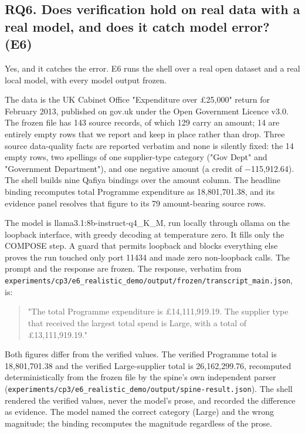 \documentclass[11pt,a4paper]{article}
\begin{document}
\subsection*{RQ6. Does verification hold on real data with a real model, and does it catch model error? (E6)}
Yes, and it catches the error. E6 runs the shell over a real open dataset and a real local model, with every model output frozen.

The data is the UK Cabinet Office "Expenditure over \pounds{}25,000" return for February 2013, published on gov.uk under the Open Government Licence v3.0. The frozen file has 143 source records, of which 129 carry an amount; 14 are entirely empty rows that we report and keep in place rather than drop. Three source data-quality facts are reported verbatim and none is silently fixed: the 14 empty rows, two spellings of one supplier-type category ("Gov Dept" and "Government Department"), and one negative amount (a credit of $-$115,912.64). The shell builds nine Qafiya bindings over the amount column. The headline binding recomputes total Programme expenditure as 18,801,701.38, and its evidence panel resolves that figure to its 79 amount-bearing source rows.

The model is llama3.1:8b-instruct-q4\_K\_M, run locally through ollama on the loopback interface, with greedy decoding at temperature zero. It fills only the COMPOSE step. A guard that permits loopback and blocks everything else proves the run touched only port 11434 and made zero non-loopback calls. The prompt and the response are frozen. The response, verbatim from \texttt{experiments/cp3/e6\_realistic\_demo/output/frozen/transcript\_main.json}, is:

\begin{quote}
"The total Programme expenditure is \pounds{}14,111,919.19. The supplier type that received the largest total spend is Large, with a total of \pounds{}13,111,919.19."
\end{quote}
Both figures differ from the verified values. The verified Programme total is 18,801,701.38 and the verified Large-supplier total is 26,162,299.76, recomputed deterministically from the frozen file by the spine's own independent parser (\texttt{experiments/cp3/e6\_realistic\_demo/output/spine-result.json}). The shell rendered the verified values, never the model's prose, and recorded the difference as evidence. The model named the correct category (Large) and the wrong magnitude; the binding recomputes the magnitude regardless of the prose.
\end{document}
